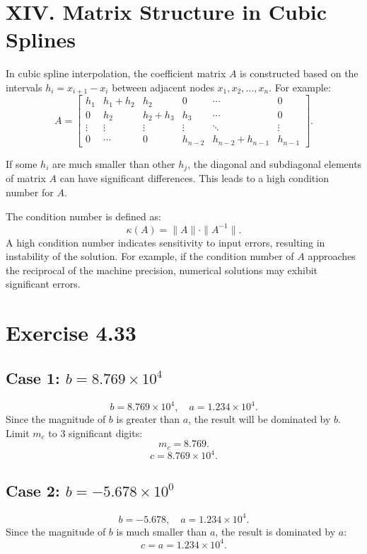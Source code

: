 \documentclass{article}
\begin{document}
\section{XIV. Matrix Structure in Cubic Splines}
In cubic spline interpolation, the coefficient matrix \( A \) is constructed based on the intervals \( h_i = x_{i+1} - x_i \) between adjacent nodes \( x_1, x_2, \ldots, x_n \). For example:
\[
A =
\begin{bmatrix}
h_1 & h_1 + h_2 & h_2 & 0 & \cdots & 0 \\
0 & h_2 & h_2 + h_3 & h_3 & \cdots & 0 \\
\vdots & \vdots & \vdots & \vdots & \ddots & \vdots \\
0 & \cdots & 0 & h_{n-2} & h_{n-2} + h_{n-1} & h_{n-1}
\end{bmatrix}.
\]

If some \( h_i \) are much smaller than other \( h_j \), the diagonal and subdiagonal elements of matrix \( A \) can have significant differences. This leads to a high condition number for \( A \).

The condition number is defined as:
\[
\kappa(A) = \|A\| \cdot \|A^{-1}\|.
\]
A high condition number indicates sensitivity to input errors, resulting in instability of the solution. For example, if the condition number of \( A \) approaches the reciprocal of the machine precision, numerical solutions may exhibit significant errors.

\section{Exercise 4.33}
\subsection{Case 1: \( b = 8.769 \times 10^4 \)}
   \[
   b = 8.769 \times 10^4, \quad a = 1.234 \times 10^4.
   \]
Since the magnitude of \( b \) is greater than \( a \), the result will be dominated by \( b \).
   Limit \( m_c \) to 3 significant digits:
   \[
   m_c = 8.769.
   \]
   \[
   c = 8.769 \times 10^4.
   \]


\subsection{Case 2: \( b = -5.678 \times 10^0 \)}
   \[
   b = -5.678, \quad a = 1.234 \times 10^4.
   \]
   Since the magnitude of \( b \) is much smaller than \( a \), the result is dominated by \( a \):
   \[
   c = a = 1.234 \times 10^4.
   \]
\end{document}
